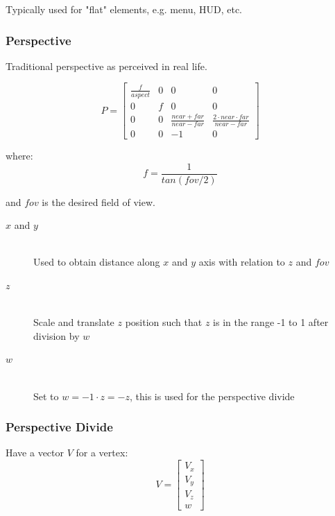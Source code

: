 \documentclass[a4paper]{article}
\begin{document}
Typically used for "flat" elements, e.g. menu, HUD, etc.

\subsubsection{Perspective}

Traditional perspective as perceived in real life.

\[
  P =
  \left [
    \begin{array}{cccc}
      \frac{f}{aspect}  & 0 & 0                             & 0 \\
      0                 & f & 0                             & 0 \\
      0                 & 0 & \frac{near + far}{near - far} & \frac{2 \cdot near \cdot far}{near - far} \\
      0                 & 0 & -1                            & 0
    \end{array}
  \right ]
\]

where:
\[
  f = \frac{1}{tan(fov / 2)}
\]

and $fov$ is the desired field of view.

\begin{description}
  \item[$x$ and $y$] \hfill \\
    Used to obtain distance along $x$ and $y$ axis with relation to $z$ and
    $fov$

  \item[$z$] \hfill \\
    Scale and translate $z$ position such that $z$ is in the range -1 to 1 after
    division by $w$

  \item[$w$] \hfill \\
    Set to $w = -1 \cdot z = -z$, this is used for the perspective divide

\end{description}

\subsubsection{Perspective Divide}

Have a vector $V$ for a vertex:
\[
  V =
  \left [
    \begin{array}{c}
      V_{x} \\
      V_{y} \\
      V_{z} \\
      w
    \end{array}
  \right ]
\]
\end{document}
